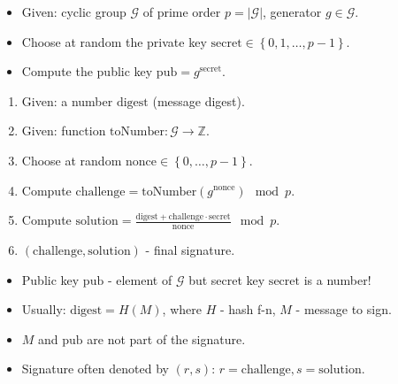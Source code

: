 \begin{frame}
\vskip -0.15cm
\begin{emptyTheorem}
\begin{itemize}

\item Given: cyclic group $\mathcal G$ of prime order $p=|\mathcal G|$, generator $g\in \mathcal G$.
\item Choose at random the private key $\mathrm{secret} \in \left\{0,1,\dots, p-1 \right\}$.
\item Compute the public key $\mathrm{pub} = g^{\mathrm{secret}}$.
\end{itemize}
\end{emptyTheorem}
\vskip -0.15cm


\vskip -0.15cm
\begin{emptyTheorem}
\begin{enumerate}
\item Given: a number $\mathrm{digest}$ (message digest). 
\item Given: function $\mathrm{toNumber}:\mathcal G\to \mathbb Z$.
\item Choose at random $\mathrm{nonce} \in \left\{0,\dots, p-1\right\}$.
\item Compute $\mathrm{challenge} = \mathrm{toNumber} (g^{\mathrm{nonce}}) \mod p $.
\item Compute $\mathrm{solution} = \frac{\mathrm{digest} + \mathrm{challenge}\cdot \mathrm{secret}}{\mathrm{nonce}} \mod p$.
\item $(\mathrm{challenge}, \mathrm{solution})$ - final signature. 
\end{enumerate}
\end{emptyTheorem}
\vskip -0.2cm
\begin{itemize}
\item Public key $\mathrm{pub}$ - element of $\mathcal G$ but secret key $\mathrm{secret}$ is a number! 
\item Usually: $\mathrm{digest}= H(M)$, where $H$ - hash f-n, $M$ - message to sign. 
\item $M$ and $\textrm{pub}$ are not part of the signature.
\item Signature often denoted by $(r,s)$: $r= \mathrm{challenge}, s= \mathrm{solution}$.
\end{itemize}
\end{frame}

